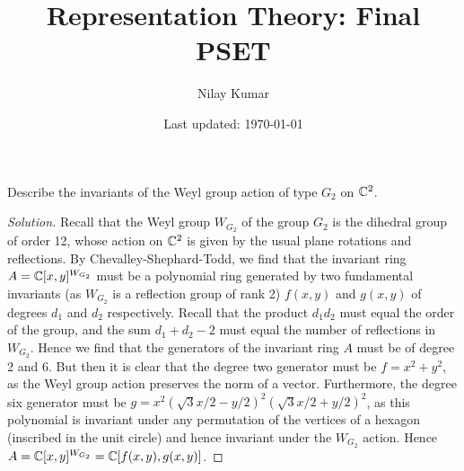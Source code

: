 \documentclass{../../mathnotes}
\title{Representation Theory: Final PSET}
\author{Nilay Kumar}
\date{Last updated: \today}
\begin{document}
\maketitle

\begin{exc}
    Describe the invariants of the Weyl group action of type $G_2$ on $\mathbb{C}^2$.
\end{exc}
\begin{proof}[Solution]
    Recall that the Weyl group $W_{G_2}$ of the group $G_2$ is the dihedral group of order 12,
    whose action on $\mathbb{C}^2$ is given by the usual plane rotations and reflections. By Chevalley-Shephard-Todd,
    we find that the invariant ring $A=\mathbb{C}[x,y]^{W_{G_2}}$ must be a polynomial ring generated by
    two fundamental invariants (as $W_{G_2}$ is a reflection group of rank 2) $f(x,y)$ and $g(x,y)$ of degrees
    $d_1$ and $d_2$ respectively. Recall that the product $d_1d_2$ must equal the order of the group,
    and the sum $d_1+d_2-2$ must equal the number of reflections in $W_{G_2}$. Hence we find that the
    generators of the invariant ring $A$ must be of degree 2 and 6. But then it is clear that the degree
    two generator must be $f=x^2+y^2$, as the Weyl group action preserves the norm of a vector. Furthermore,
    the degree six generator must be $g=x^2(\sqrt{3}x/2-y/2)^2(\sqrt{3}x/2+y/2)^2$, as this polynomial
    is invariant under any permutation of the vertices of a hexagon (inscribed in the unit circle) and
    hence invariant under the $W_{G_2}$ action. Hence $A=\mathbb{C}[x,y]^{W_{G_2}}=\mathbb{C}[f(x,y),g(x,y)]$.
\end{proof}
\end{document}
